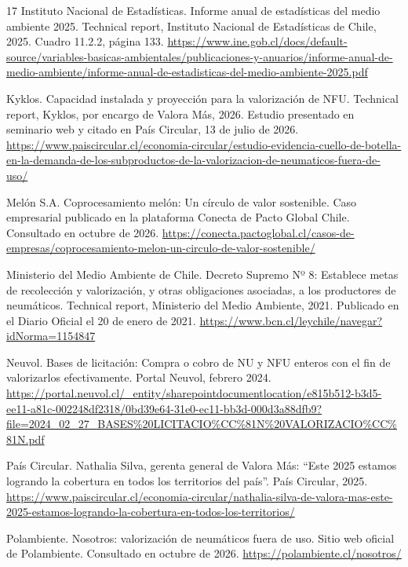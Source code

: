 \documentclass[letterpaper]{article}
\begin{document}
{\begin{thebibliography}{17}
Instituto Nacional de Estadísticas. Informe anual de estadísticas del medio ambiente 2025. Technical report, Instituto Nacional de Estadísticas de Chile, 2025. Cuadro 11.2.2, página 133. \url{https://www.ine.gob.cl/docs/default-source/variables-basicas-ambientales/publicaciones-y-anuarios/informe-anual-de-medio-ambiente/informe-anual-de-estadisticas-del-medio-ambiente-2025.pdf}

Kyklos. Capacidad instalada y proyección para la valorización de NFU. Technical report, Kyklos, por encargo de Valora Más, 2026. Estudio presentado en seminario web y citado en País Circular, 13 de julio de 2026. \url{https://www.paiscircular.cl/economia-circular/estudio-evidencia-cuello-de-botella-en-la-demanda-de-los-subproductos-de-la-valorizacion-de-neumaticos-fuera-de-uso/}

Melón S.A. Coprocesamiento melón: Un círculo de valor sostenible. Caso empresarial publicado en la plataforma Conecta de Pacto Global Chile. Consultado en octubre de 2026. \url{https://conecta.pactoglobal.cl/casos-de-empresas/coprocesamiento-melon-un-circulo-de-valor-sostenible/}

Ministerio del Medio Ambiente de Chile. Decreto Supremo Nº 8: Establece metas de recolección y valorización, y otras obligaciones asociadas, a los productores de neumáticos. Technical report, Ministerio del Medio Ambiente, 2021. Publicado en el Diario Oficial el 20 de enero de 2021. \url{https://www.bcn.cl/leychile/navegar?idNorma=1154847}

Neuvol. Bases de licitación: Compra o cobro de NU y NFU enteros con el fin de valorizarlos efectivamente. Portal Neuvol, febrero 2024. \url{https://portal.neuvol.cl/_entity/sharepointdocumentlocation/e815b512-b3d5-ee11-a81c-002248df2318/0bd39e64-31e0-ec11-bb3d-000d3a88dfb9?file=2024_02_27_BASES\%20LICITACIO\%CC\%81N\%20VALORIZACIO\%CC\%81N.pdf}

País Circular. Nathalia Silva, gerenta general de Valora Más: “Este 2025 estamos logrando la cobertura en todos los territorios del país”. País Circular, 2025. \url{https://www.paiscircular.cl/economia-circular/nathalia-silva-de-valora-mas-este-2025-estamos-logrando-la-cobertura-en-todos-los-territorios/}

Polambiente. Nosotros: valorización de neumáticos fuera de uso. Sitio web oficial de Polambiente. Consultado en octubre de 2026. \url{https://polambiente.cl/nosotros/}


\end{thebibliography}}
\end{document}

